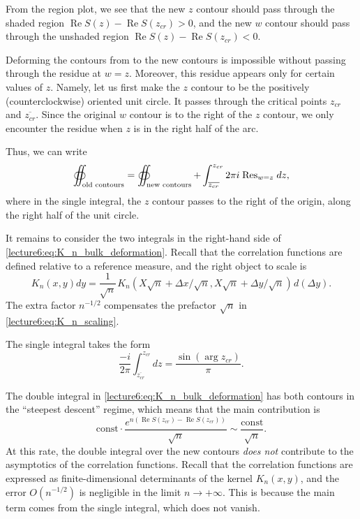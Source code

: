 \documentclass[letterpaper,11pt,oneside,reqno]{book}
\numberwithin{equation}{chapter}  %
\newcommand{\ssp}{\hspace{1pt}}
\theoremstyle{definition}
\begin{document}
From the region plot, we see that the new $z$ contour should
pass through the shaded region $\operatorname{Re}S(z)-\operatorname{Re}S(z_{cr})>0$,
and the new $w$ contour should pass through the unshaded region
$\operatorname{Re}S(z)-\operatorname{Re}S(z_{cr})<0$.

Deforming the contours from  to the new contours
is impossible without passing through the residue at $w=z$.
Moreover, this residue appears only for certain values of $z$. Namely,
let us first make the $z$ contour to be the positively (counterclockwise) oriented
unit circle.
It passes through the critical points $z_{cr}$ and $\overline{z_{cr}}$.
Since the original $w$ contour is to the right of the $z$ contour, we only
encounter the residue when $z$ is in the right half of the arc.

Thus, we can write
\begin{equation}
	\label{lecture6:eq:K_n_bulk_deformation}
	\oiint_{\textnormal{old contours}}=
	\oiint_{\textnormal{new contours}}
	+
	\int_{\overline{z_{cr}}}^{z_{cr}}
	2\pi i\ssp \operatorname{Res}\limits_{w=z}\ssp dz,
\end{equation}
where in the single integral, the $z$ contour passes to the right of the origin,
along the right half of the unit circle.

It remains to consider the two integrals in the right-hand side
of \eqref{lecture6:eq:K_n_bulk_deformation}.
Recall that the correlation functions are
defined relative to a reference measure, and the right object to scale is
\begin{equation*}
	K_n(x,y)dy=\frac{1}{\sqrt n}
	\ssp
	K_n(X\sqrt n+\Delta x/\sqrt n,X\sqrt n+\Delta y/\sqrt n)
	\ssp d\left( \Delta y \right).
\end{equation*}
The extra factor $n^{-1/2}$
compensates the prefactor $\sqrt n$ in
\eqref{lecture6:eq:K_n_scaling}.

The single integral takes the form
\begin{equation}
	\label{lecture6:eq:K_n_bulk_single}
	\frac{-i}{2\pi}
	\int_{\overline{z_{cr}}}^{z_{cr}}
	dz
	=\frac{\sin(\arg z_{cr})}{\pi}.
\end{equation}

The double integral
in \eqref{lecture6:eq:K_n_bulk_deformation}
has both contours
in the ``steepest descent'' regime, which means that
the main contribution is
\begin{equation*}
	\mathrm{const}\cdot
	\frac{e^{n\left( \operatorname{Re}S(z_{cr})-\operatorname{Re}S(z_{cr}) \right)}}{\sqrt n}
	\sim \frac{\mathrm{const}}{\sqrt n}.
\end{equation*}
At this rate, the double integral over the new contours
\emph{does not} contribute to the asymptotics of the correlation functions.
Recall that the correlation functions are expressed as finite-dimensional
determinants of the kernel $K_n(x,y)$, and the error $O(n^{-1/2})$ is
negligible in the limit $n\to+\infty$.
This is because the main term comes from the single integral,
which does not vanish.
\end{document}

